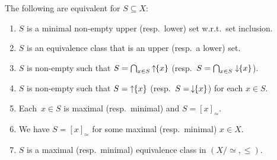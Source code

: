 \begin{proposition} \label{prelim:general:order:cor:min-equiv-class} \label{prelim:general:order:prop:min-equiv-class} \label{prelim:prop:sink-comp}
	The following are equivalent for $S \subseteq X$:
	
	\begin{enumerate}
	\item \label{prelim:general:order:cor:min-equiv-class:1} $S$ is a minimal non-empty upper (resp.~lower) set w.r.t.~set inclusion.
	
	\item \label{prelim:general:order:cor:min-equiv-class:2} $S$ is an equivalence class that is an upper (resp.~a lower) set.
	
	\item \label{prelim:general:order:cor:min-equiv-class:2a} $S$ is non-empty such that $S = \bigcap_{x \in S} \mbox{\ensuremath{\displaystyle \uparrow \!\!\{x\}}}$ (resp.~$S = \bigcap_{x\in S} \downarrow \!\!\{x\}$).
		
	\item \label{prelim:general:order:cor:min-equiv-class:3} \label{prelim:eqn:sink-comp} $S$ is non-empty such that $S = \mbox{\ensuremath{\displaystyle \uparrow \!\!\{x\}}}$ (resp.~$S = \,\downarrow \!\!\{x\}$) for each $x \in S$.
		
	\item \label{prelim:general:order:cor:min-equiv-class:4} 
	Each~$x \in S$ is maximal (resp.~minimal) and $S = [x]_{\simeq}$.
	
	\item \label{prelim:general:order:cor:min-equiv-class:4b} We have $S = [x]_{\simeq}$ for some maximal (resp.~minimal) $x \in X$.
				
	\item \label{prelim:general:order:cor:min-equiv-class:5} $S$ is a maximal (resp.~minimal) equivalence class in $(X / {\simeq}, \le)$.	
	\end{enumerate}
\end{proposition}
